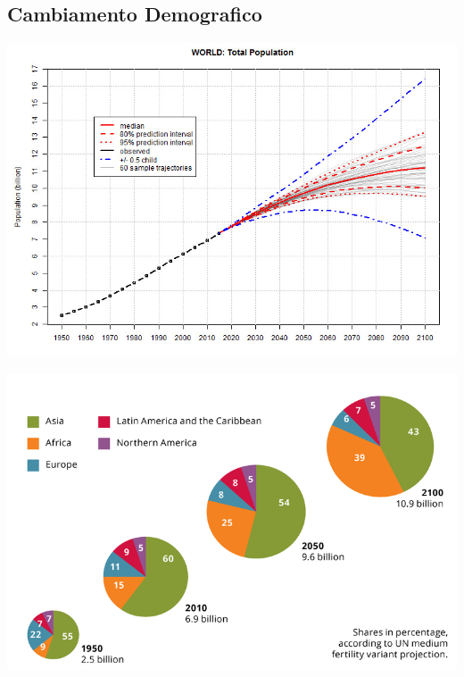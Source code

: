 \documentclass[a4paper,12pt, oneside]{book}
\begin{document}
\subsection{Cambiamento Demografico}
 \begin{center}
  \begin{minipage}{0.48\linewidth}
    \includegraphics[width=\linewidth]{"Immagini/future-timeline-2050-2100"}
    \label{fig:populationgrowth}
  \end{minipage}%
\hfill
  \begin{minipage}{0.46\linewidth}
    \includegraphics[width=\linewidth]{"Immagini/countries_growth_1950_2100"}
    \label{fig:countriesgrowth}
  \end{minipage}
 \end{center}
\end{document}
